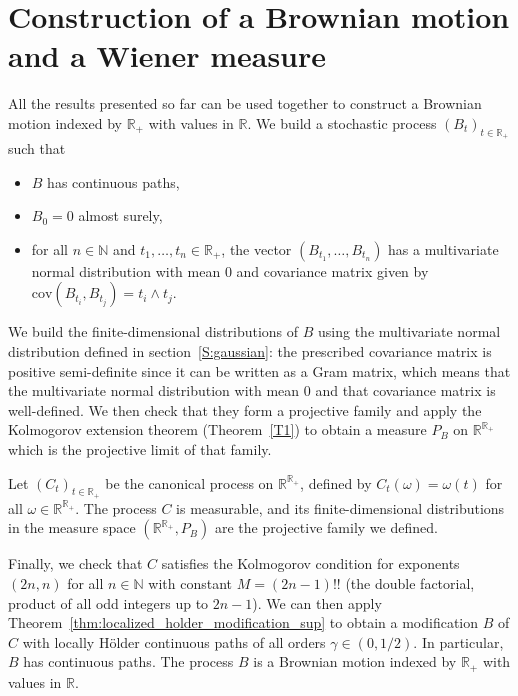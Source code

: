 \documentclass[lean]{Draft}
\begin{document}
\section{Construction of a Brownian motion and a Wiener measure}
\label{S:BM}

All the results presented so far can be used together to construct a Brownian motion indexed by $\mathbb{R}_+$ with values in $\mathbb{R}$.
We build a stochastic process $(B_t)_{t \in \mathbb{R}_+}$ such that
\begin{itemize}
  \item $B$ has continuous paths,
  \item $B_0 = 0$ almost surely,
  \item for all $n \in \mathbb{N}$ and $t_1, \ldots, t_n \in \mathbb{R}_+$, the vector $(B_{t_1}, \ldots, B_{t_n})$ has a multivariate normal distribution with mean $0$ and covariance matrix given by $\mathrm{cov}(B_{t_i}, B_{t_j}) = t_i \wedge t_j$.
\end{itemize}

We build the finite-dimensional distributions of $B$ using the multivariate normal distribution defined in section~\ref{S:gaussian}: the prescribed covariance matrix is positive semi-definite since it can be written as a Gram matrix, which means that the multivariate normal distribution with mean 0 and that covariance matrix is well-defined.
We then check that they form a projective family and apply the Kolmogorov extension theorem (Theorem~\ref{T1}) to obtain a measure $P_B$ on $\mathbb{R}^{\mathbb{R}_+}$ which is the projective limit of that family.

Let $(C_t)_{t \in \mathbb{R}_+}$ be the canonical process on $\mathbb{R}^{\mathbb{R}_+}$, defined by $C_t(\omega) = \omega(t)$ for all $\omega \in \mathbb{R}^{\mathbb{R}_+}$.
The process $C$ is measurable, and its finite-dimensional distributions in the measure space $(\mathbb{R}^{\mathbb{R}_+}, P_B)$ are the projective family we defined.

Finally, we check that $C$ satisfies the Kolmogorov condition for exponents $(2n, n)$ for all $n \in \mathbb{N}$ with constant $M = (2n - 1)!!$ (the double factorial, product of all odd integers up to $2n - 1$).
We can then apply Theorem~\ref{thm:localized_holder_modification_sup} to obtain a modification $B$ of $C$ with locally Hölder continuous paths of all orders $\gamma \in (0, 1/2)$.
In particular, $B$ has continuous paths.
The process $B$ is a Brownian motion indexed by $\mathbb{R}_+$ with values in $\mathbb{R}$.
\end{document}
